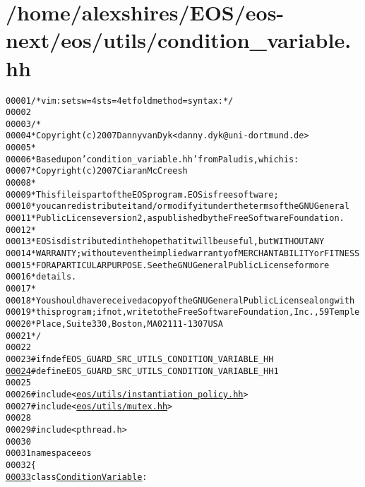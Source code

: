 \hypertarget{condition__variable_8hh_source}{
\section{/home/alexshires/EOS/eos-\/next/eos/utils/condition\_\-variable.hh}
}


\begin{footnotesize}\begin{alltt}
00001 \textcolor{comment}{/* vim: set sw=4 sts=4 et foldmethod=syntax : */}
00002 
00003 \textcolor{comment}{/*}
00004 \textcolor{comment}{ * Copyright (c) 2007 Danny van Dyk <danny.dyk@uni-dortmund.de>}
00005 \textcolor{comment}{ *}
00006 \textcolor{comment}{ * Based upon 'condition\_variable.hh' from Paludis, which is:}
00007 \textcolor{comment}{ *     Copyright (c) 2007 Ciaran McCreesh}
00008 \textcolor{comment}{ *}
00009 \textcolor{comment}{ * This file is part of the EOS program. EOS is free software;}
00010 \textcolor{comment}{ * you can redistribute it and/or modify it under the terms of the GNU General}
00011 \textcolor{comment}{ * Public License version 2, as published by the Free Software Foundation.}
00012 \textcolor{comment}{ *}
00013 \textcolor{comment}{ * EOS is distributed in the hope that it will be useful, but WITHOUT ANY}
00014 \textcolor{comment}{ * WARRANTY; without even the implied warranty of MERCHANTABILITY or FITNESS}
00015 \textcolor{comment}{ * FOR A PARTICULAR PURPOSE.  See the GNU General Public License for more}
00016 \textcolor{comment}{ * details.}
00017 \textcolor{comment}{ *}
00018 \textcolor{comment}{ * You should have received a copy of the GNU General Public License along with}
00019 \textcolor{comment}{ * this program; if not, write to the Free Software Foundation, Inc., 59 Temple}
00020 \textcolor{comment}{ * Place, Suite 330, Boston, MA  02111-1307  USA}
00021 \textcolor{comment}{ */}
00022 
00023 \textcolor{preprocessor}{#ifndef EOS\_GUARD\_SRC\_UTILS\_CONDITION\_VARIABLE\_HH}
\hypertarget{condition__variable_8hh_source_l00024}{}\hyperlink{condition__variable_8hh_af003c450e5342b76fc2bc1b26acb445d}{00024} \textcolor{preprocessor}{}\textcolor{preprocessor}{#define EOS\_GUARD\_SRC\_UTILS\_CONDITION\_VARIABLE\_HH 1}
00025 \textcolor{preprocessor}{}
00026 \textcolor{preprocessor}{#include <\hyperlink{instantiation__policy_8hh}{eos/utils/instantiation_policy.hh}>}
00027 \textcolor{preprocessor}{#include <\hyperlink{mutex_8hh}{eos/utils/mutex.hh}>}
00028 
00029 \textcolor{preprocessor}{#include <pthread.h>}
00030 
00031 \textcolor{keyword}{namespace }eos
00032 \{
\hypertarget{condition__variable_8hh_source_l00033}{}\hyperlink{classeos_1_1ConditionVariable}{00033}     \textcolor{keyword}{class }\hyperlink{classeos_1_1ConditionVariable}{ConditionVariable} :

\end{alltt}
\end{footnotesize}
